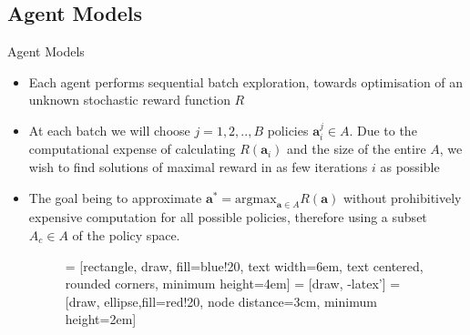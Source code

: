 \documentclass{beamer}
\begin{document}
\subsection{Agent Models}
\begin{frame}{Agent Models}
\begin{itemize}
\item Each agent performs sequential batch exploration, towards optimisation of an unknown stochastic reward function $R$
\item At each batch we will choose $j=1,2,..,B$ policies $\bm{a}_i^j \in A$. Due to the computational expense of calculating $R(\bm{a}_i)$ and the size of the entire $A$, we wish to find solutions of maximal reward in as few iterations $i$ as possible
\item The goal being to approximate $\bm{a}^* = \mbox{argmax}_{\bm{a} \in A}R(\bm{a})$ without prohibitively expensive computation for all possible policies, therefore using a subset $A_c \in A$ of the policy space.

\begin{figure}[!t]
\centering
{} = [rectangle, draw, fill=blue!20, 
    text width=6em, text centered, rounded corners, minimum height=4em]
 = [draw, -latex']
 = [draw, ellipse,fill=red!20, node distance=3cm,
    minimum height=2em]
    
\label{fig_flow}
\end{figure}

\end{itemize}
  

\end{frame}
\end{document}
